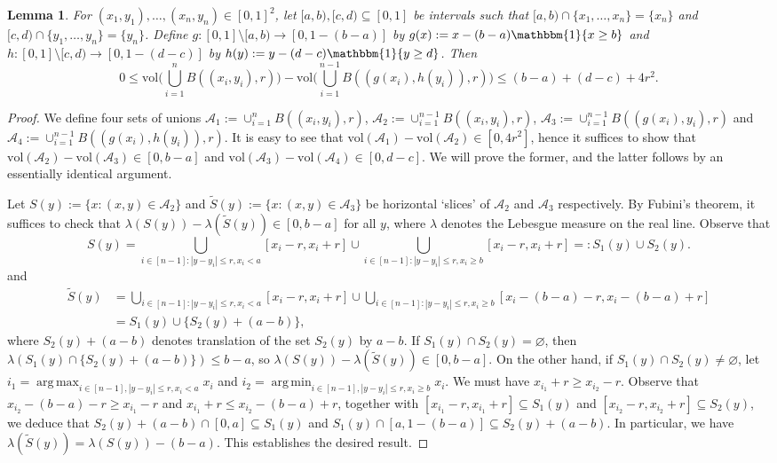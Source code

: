 \documentclass[11pt]{article}
\newtheorem{lemma}[thm]{Lemma}
\DeclareMathOperator*{\argmax}{arg\,max}
\DeclareMathOperator*{\argmin}{arg\,min}
\newcommand{\vol}{\mathrm{vol}}
\begin{document}
\begin{lemma}
    \label{Lemma:VolumeCompress}
    For $(x_1,y_1),\ldots,(x_n,y_n) \in [0,1]^2$, let $[a,b), [c,d)\subseteq[0,1]$ be intervals such that $[a,b)\cap \{x_1,\ldots,x_n\} = \{x_n\}$ and $[c,d)\cap \{y_1,\ldots,y_n\} = \{y_n\}$. Define $g:[0,1]\setminus [a,b) \to [0, 1-(b-a)]$ by $g(x):= x- (b-a)\mathbbm{1}\{x\geq b\}$ and $h:[0,1]\setminus [c,d) \to [0,1-(d-c)]$ by $h(y):=y-(d-c)\mathbbm{1}\{y\geq d\}$. Then
    \[
    0\leq \mathrm{vol}\biggl(\bigcup_{i=1}^n B((x_i,y_i), r)\biggr) - \mathrm{vol}\biggl(\bigcup_{i=1}^{n-1} B((g(x_i),h(y_i)), r)\biggr)\leq (b-a)+(d-c) + 4r^2.
    \]
\end{lemma}
\begin{proof}
    We define four sets of unions $\mathcal{A}_1 := \cup_{i=1}^n B((x_i,y_i), r)$, $\mathcal{A}_2 := \cup_{i=1}^{n-1} B((x_i,y_i), r)$, $\mathcal{A}_3 := \cup_{i=1}^{n-1} B((g(x_i),y_i), r)$ and $\mathcal{A}_4 := \cup_{i=1}^{n-1} B((g(x_i),h(y_i)), r)$. It is easy to see that $\vol(\mathcal{A}_1)-\vol(\mathcal{A}_2)\in [0, 4r^2]$, hence it suffices to show that $\vol(\mathcal{A}_2)-\vol(\mathcal{A}_3)\in [0, b-a]$ and $\vol(\mathcal{A}_3)-\vol(\mathcal{A}_4)\in [0, d-c]$. We will prove the former, and the latter follows by an essentially identical argument. 

    Let $S(y):= \{x: (x,y)\in \mathcal{A}_2\}$ and $\tilde S(y):=\{x:(x,y)\in\mathcal{A}_3\}$ be horizontal `slices' of $\mathcal{A}_2$ and $\mathcal{A}_3$ respectively. By Fubini's theorem, it suffices to check that $\lambda(S(y))-\lambda(\tilde{S}(y)) \in[0,b-a]$ for all $y$, where $\lambda$ denotes the Lebesgue measure on the real line. Observe that 
    \[  
    S(y) = \bigcup_{i\in[n-1]: |y-y_i|\leq r, x_i < a} [x_i-r,x_i+r] \cup \bigcup_{i\in[n-1]: |y-y_i|\leq r, x_i \geq b} [x_i-r,x_i+r] =: S_1(y) \cup S_2(y).
    \]
    and 
    \begin{align*}
    \tilde{S}(y) &= \bigcup_{i\in[n-1]: |y-y_i|\leq r, x_i < a} [x_i-r,x_i+r] \cup \bigcup_{i\in[n-1]: |y-y_i|\leq r, x_i \geq b} [x_i-(b-a)-r,x_i-(b-a)+r]\\
    &=S_1(y)\cup \{S_2(y) + (a-b)\},
    \end{align*}
    where $S_2(y)+(a-b)$ denotes translation of the set $S_2(y)$ by $a-b$.
    If $S_1(y)\cap S_2(y) = \varnothing$, then $\lambda(S_1(y)\cap \{S_2(y)+(a-b)\}) \leq b-a$, so $\lambda(S(y)) - \lambda(\tilde S(y)) \in [0, b-a]$. On the other hand, if $S_1(y)\cap S_2(y)\neq \varnothing$, let $i_1 = \argmax_{i\in[n-1],|y-y_i|\leq r, x_i < a} x_i$ and $i_2 = \argmin_{i\in[n-1],|y-y_i|\leq r, x_i \geq b} x_i$. We must have $x_{i_1} + r \geq x_{i_2}-r$. Observe that $x_{i_2} - (b-a) - r \geq x_{i_1} - r$ and $x_{i_1}+r \leq x_{i_2}-(b-a) + r$, together with $[x_{i_1}-r,x_{i_1}+r]\subseteq S_1(y)$ and $[x_{i_2}-r,x_{i_2}+r]\subseteq S_2(y)$, we deduce that $S_2(y) + (a-b) \cap [0, a] \subseteq S_1(y)$ and $S_1(y) \cap [a,1-(b-a)] \subseteq S_2(y)+(a-b)$. In particular, we have $\lambda(\tilde S(y)) = \lambda(S(y)) - (b-a)$. This establishes the desired result.
\end{proof}
\end{document}
